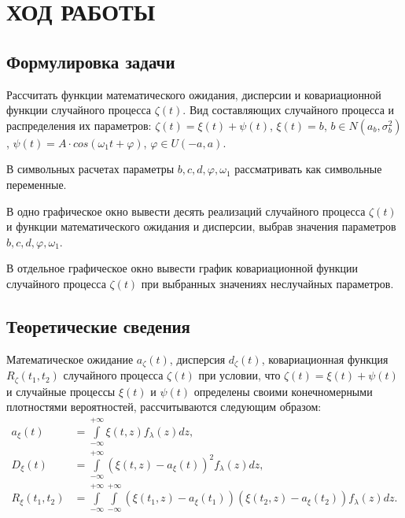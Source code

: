 \section{ХОД РАБОТЫ}

\subsection{Формулировка задачи}

Рассчитать функции математического ожидания, дисперсии и ковариационной функции
случайного процесса $ \zeta(t) $. Вид составляющих случайного процесса
и распределения их параметров:
$ \zeta(t)= \xi(t) + \psi(t) $,
$ \xi(t) = b $,
$ b \in N(a_b, \sigma^2_b) $,
$ \psi(t) = A \cdot cos(\omega_1 t + \varphi) $,
$ \varphi \in U(-a,a)$.

В символьных расчетах параметры $ b, c, d,
\varphi, \omega_1 $ рассматривать как символьные переменные.

В одно графическое окно вывести десять реализаций случайного процесса $ \zeta(t) $
и функции математического ожидания и дисперсии, выбрав значения
параметров $ b, c, d, \varphi, \omega_1 $.

В отдельное графическое окно вывести график ковариационной функции
случайного процесса $ \zeta(t) $ при выбранных значениях неслучайных параметров.


\subsection{Теоретические сведения}

Математическое ожидание $ a_{\zeta} (t) $, дисперсия $ d_{\zeta} (t) $,
ковариационная функция $ R_{\zeta} (t_1, t_2) $ случайного процесса $ \zeta(t) $
при условии, что $ \zeta(t) = \xi(t) + \psi(t) $ и случайные процессы $ \xi(t) $
и $ \psi(t) $ определены своими конечномерными плотностями вероятностей, рассчитываются
следующим образом:
\begin{align*}
  a_{\xi}(t) &= \int\limits_{-\infty}^{+\infty}  \xi(t, z) f_{\lambda}(z) dz, \\ 
  D_{\xi}(t) &= \int\limits_{-\infty}^{+\infty} (\xi(t, z) - a_{\xi}(t))^2 f_{\lambda}(z) dz, \\
  R_{\xi}(t_1, t_2) &= \int\limits_{-\infty}^{+\infty} \int\limits_{-\infty}^{+\infty} (\xi(t_1, z) - a_{\xi}(t_1)) (\xi(t_2, z) - a_{\xi}(t_2)) f_{\lambda}(z) dz. \\
\end{align*}


\pagebreak
